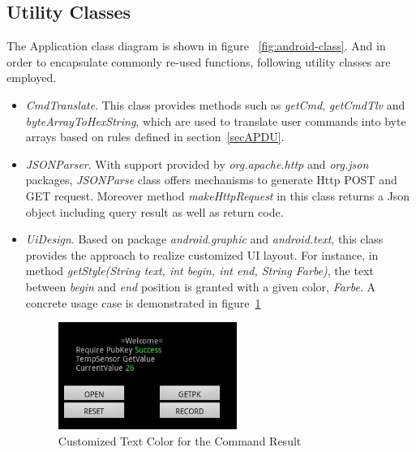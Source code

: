 \subsection{Utility Classes}
The Application class diagram is shown in figure ~\ref{fig:android-class}. And in order to encapsulate commonly re-used functions, following utility classes are employed.
\begin{itemize}
\item \emph{CmdTranslate}. This class provides methods such as \emph{getCmd}, \emph{getCmdTlv} and \emph{byteArrayToHexString}, which are used to translate user commands into byte arrays based on rules defined in section~\ref{secAPDU}.
\item \emph{JSONParser}. With support provided by \emph{org.apache.http} and \emph{org.json} packages, \emph{JSONParse} class offers mechanisms to generate Http POST and GET request. Moreover method \emph{makeHttpRequest} in this class returns a Json object including query result as well as return code.
\item \emph{UiDesign}. Based on package \emph{android.graphic} and \emph{android.text}, this class provides the approach to realize customized UI layout. For instance, in method \emph{getStyle(String text, int begin, int end, String Farbe)}, the text between \emph{begin} and \emph{end} position is granted with a given color,  \emph{Farbe}. A concrete usage case is demonstrated in figure~\ref{fig:get-style}

\begin{figure}[!htbp]
	\centering
	\includegraphics[width=0.55\textwidth]{get-style.jpg}
		\caption{Customized Text Color for the Command Result}
	\label{fig:get-style}
\end{figure}

\end{itemize} 
